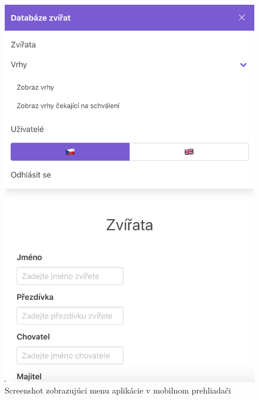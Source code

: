 \begin{figure}[H]
	\includegraphics[width=1.0\textwidth]{media/priloha/mobil/1.png}
	\caption{Screenshot zobrazujúci menu aplikácie v mobilnom prehliadači}
\end{figure}

